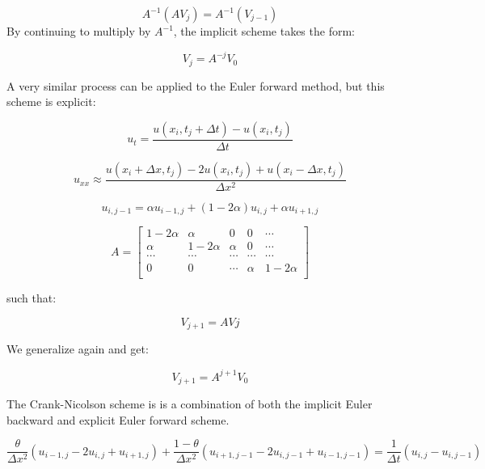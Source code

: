 \documentclass[10pt,a4paper]{article}
\begin{document}
\begin{equation}
A^{-1}(AV_j) = A^{-1}(V_{j-1})
\end{equation}
\noindent By continuing to multiply by $A^{-1}$, the implicit scheme takes the form:

\begin{equation}
V_j = A^{-j}V_0
\end{equation}

\noindent A very similar process can be applied to the Euler forward method, but this scheme is explicit:

\begin{equation}
u_t = \frac{u(x_i,t_j + \Delta t) - u(x_i,t_j)}{\Delta t}
\end{equation}

\begin{equation}
u_{xx} \approx \frac{u(x_i + \Delta x,t_j) - 2u(x_i,t_j) + u(x_i - \Delta x,t_j)}{\Delta x^2} 
\end{equation}

\begin{equation}
u_{i,j-1} = \alpha u_{i-1,j} + (1 - 2\alpha)u_{i,j} + \alpha u_{i+1,j}
\end{equation}

\begin{equation}
A = \begin{bmatrix}
1 - 2\alpha & \alpha & 0 & 0 &\cdots\\
\alpha & 1 - 2\alpha & \alpha & 0 & \cdots\\
\cdots & \cdots & \cdots & \cdots & \cdots\\
0 & 0 & \cdots & \alpha & 1 - 2\alpha\\

\end{bmatrix}
\end{equation}

\noindent such that:

\begin{equation}
V_{j+1} = AVj
\end{equation}

\noindent We generalize again and get:

\begin{equation}
V_{j+1}= A^{j+1}V_{0}
\end{equation}

\noindent The Crank-Nicolson scheme is is a combination of both the implicit Euler backward and explicit Euler forward scheme.

\begin{equation}
\frac{\theta}{\Delta x^2}(u_{i-1,j} - 2u_{i,j} + u_{i+1,j}) + \frac{1 - \theta}{\Delta x^2}(u_{i+1,j-1} - 2u_{i,j-1} + u_{i-1,j-1}) = \frac{1}{\Delta t}(u_{i,j} - u_{i,j-1})
\end{equation}
\end{document}
